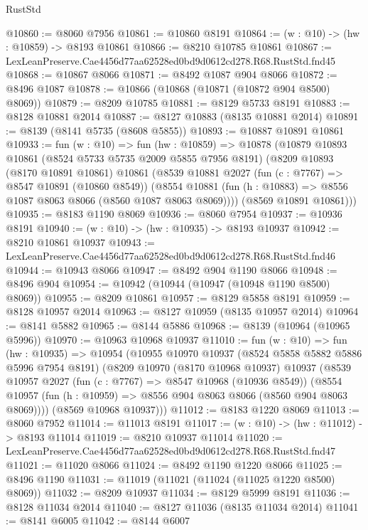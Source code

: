 \begin{lexlean}{RustStd}
\begin{coremodule}
@10860 := @8060 @7956
@10861 := @10860 @8191
@10864 := (w : @10) -> (hw : @10859) -> @8193 @10861
@10866 := @8210 @10785 @10861
@10867 := LexLeanPreserve.Cae4456d77aa62528ed0bd9d0612cd278.R68.RustStd.fnd45
@10868 := @10867 @8066
@10871 := @8492 @1087 @904 @8066
@10872 := @8496 @1087
@10878 := @10866 (@10868 (@10871 (@10872 @904 @8500) @8069))
@10879 := @8209 @10785
@10881 := @8129 @5733 @8191
@10883 := @8128 @10881 @2014
@10887 := @8127 @10883 (@8135 @10881 @2014)
@10891 := @8139 (@8141 @5735 (@8608 @5855))
@10893 := @10887 @10891 @10861
@10933 := fun (w : @10) =>
  fun (hw : @10859) =>
  @10878
    (@10879
      @10893
      @10861
      (@8524 @5733 @5735 @2009 @5855 @7956 @8191)
      (@8209
        @10893
        (@8170 @10891 @10861)
        @10861
        (@8539
          @10881
          @2027
          (fun (c : @7767) => @8547 @10891 (@10860 @8549))
          (@8554 @10881 (fun (h : @10883) => @8556 @1087 @8063 @8066 (@8560 @1087 @8063 @8069))))
        (@8569 @10891 @10861)))
@10935 := @8183 @1190 @8069
@10936 := @8060 @7954
@10937 := @10936 @8191
@10940 := (w : @10) -> (hw : @10935) -> @8193 @10937
@10942 := @8210 @10861 @10937
@10943 := LexLeanPreserve.Cae4456d77aa62528ed0bd9d0612cd278.R68.RustStd.fnd46
@10944 := @10943 @8066
@10947 := @8492 @904 @1190 @8066
@10948 := @8496 @904
@10954 := @10942 (@10944 (@10947 (@10948 @1190 @8500) @8069))
@10955 := @8209 @10861
@10957 := @8129 @5858 @8191
@10959 := @8128 @10957 @2014
@10963 := @8127 @10959 (@8135 @10957 @2014)
@10964 := @8141 @5882
@10965 := @8144 @5886
@10968 := @8139 (@10964 (@10965 @5996))
@10970 := @10963 @10968 @10937
@11010 := fun (w : @10) =>
  fun (hw : @10935) =>
  @10954
    (@10955
      @10970
      @10937
      (@8524 @5858 @5882 @5886 @5996 @7954 @8191)
      (@8209
        @10970
        (@8170 @10968 @10937)
        @10937
        (@8539
          @10957
          @2027
          (fun (c : @7767) => @8547 @10968 (@10936 @8549))
          (@8554 @10957 (fun (h : @10959) => @8556 @904 @8063 @8066 (@8560 @904 @8063 @8069))))
        (@8569 @10968 @10937)))
@11012 := @8183 @1220 @8069
@11013 := @8060 @7952
@11014 := @11013 @8191
@11017 := (w : @10) -> (hw : @11012) -> @8193 @11014
@11019 := @8210 @10937 @11014
@11020 := LexLeanPreserve.Cae4456d77aa62528ed0bd9d0612cd278.R68.RustStd.fnd47
@11021 := @11020 @8066
@11024 := @8492 @1190 @1220 @8066
@11025 := @8496 @1190
@11031 := @11019 (@11021 (@11024 (@11025 @1220 @8500) @8069))
@11032 := @8209 @10937
@11034 := @8129 @5999 @8191
@11036 := @8128 @11034 @2014
@11040 := @8127 @11036 (@8135 @11034 @2014)
@11041 := @8141 @6005
@11042 := @8144 @6007

\end{coremodule}
\end{lexlean}
